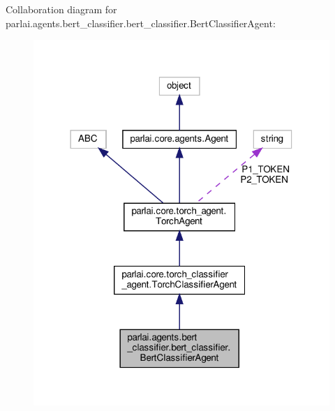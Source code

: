 Collaboration diagram for parlai.\+agents.\+bert\+\_\+classifier.\+bert\+\_\+classifier.\+Bert\+Classifier\+Agent\+:
\nopagebreak
\begin{figure}[H]
\begin{center}
\leavevmode
\includegraphics[width=318pt]{classparlai_1_1agents_1_1bert__classifier_1_1bert__classifier_1_1BertClassifierAgent__coll__graph}
\end{center}
\end{figure}
